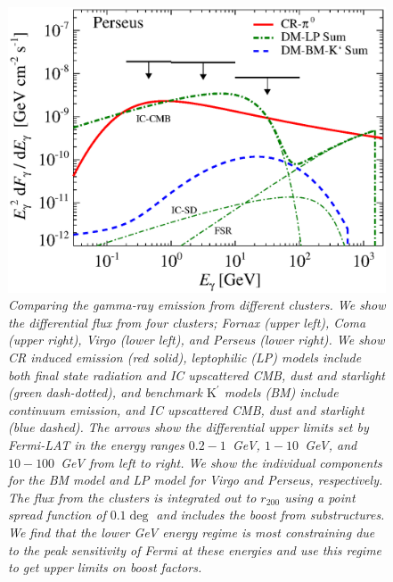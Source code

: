 \documentclass[10pt,aps,pra,reprint,amsmath,amsfonts,amssymb,showpacs,nofootinbib,floatfix]{revtex4-1}
\newcommand{\rmn}{\mathrm}
\newcommand{\Kp}{\rmn{K}^\prime}
\newcommand{\rvir}{r_{200}}
\begin{document}
\begin{figure}
\begin{minipage}{2.0\columnwidth}
\includegraphics[width=0.49\columnwidth]{figures/flux.cluster.Perseus.v11.0.1deg.1.6T.SubMass.SF300.IR2.noMW.woGal.eps}
\caption{\it Comparing the gamma-ray emission from different
  clusters. We show the differential flux from four clusters; Fornax
  (upper left), Coma (upper right), Virgo (lower left), and Perseus
  (lower right). We show CR induced emission (red solid), leptophilic
  (LP) models include both final state radiation and IC upscattered
  CMB, dust and starlight (green dash-dotted), and benchmark $\Kp$
  models (BM) include continuum emission, and IC upscattered CMB, dust
  and starlight (blue dashed). The arrows show the differential upper
  limits set by Fermi-LAT in the energy ranges $0.2-1$~GeV,
  $1-10$~GeV, and $10-100$~GeV from left to right. We show the
  individual components for the BM model and LP model for Virgo and
  Perseus, respectively. The flux from the clusters is integrated out
  to $\rvir$ using a point spread function of $0.1\deg$ and includes
  the boost from substructures. We find that the lower GeV energy
  regime is most constraining due to the peak sensitivity of Fermi at
  these energies and use this regime to get upper limits on boost
  factors.}
 \label{fig:clu_comp}
\end{minipage}
\end{figure}
\end{document}
